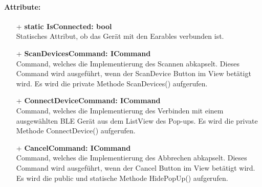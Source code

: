 \documentclass[a4paper,12pt]{article}
\begin{document}
	\paragraph{Attribute:}
	\begin{itemize}
		\item[+] \textbf{static IsConnected: bool}\\Statisches Attribut, ob das Gerät mit den \gls{Earables} verbunden ist.
		\item[+] \textbf{ScanDevicesCommand: ICommand}\\Command, welches die Implementierung des Scannen abkapselt. Dieses Command wird ausgeführt, wenn der ScanDevice Button im View betätigt wird. Es wird die private Methode ScanDevices() aufgerufen.
		\item[+] \textbf{ConnectDeviceCommand: ICommand}\\Command, welches die Implementierung des Verbinden mit einem ausgewählten BLE Gerät aus dem ListView des Pop-ups. Es wird die private Methode ConnectDevice() aufgerufen.
		\item[+] \textbf{CancelCommand: ICommand}\\Command, welches die Implementierung des Abbrechen abkapselt. Dieses Command wird ausgeführt, wenn der Cancel Button im View betätigt wird. Es wird die public und statische Methode HidePopUp() aufgerufen. 		
	\end{itemize}
\end{document}
